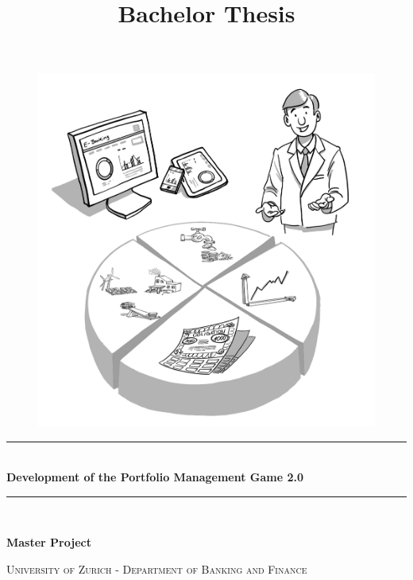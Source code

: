 \documentclass[a4paper,twoside, openright, 11pt]{scrartcl}
\title{Bachelor Thesis}
\newcommand{\HRule}{\rule{\linewidth}{0.3mm}} %
\begin{document}
\begin{titlepage}
\begingroup
\centering
\vspace*{\baselineskip}

\thispagestyle{empty}

\begin{figure}[H]
	\centering
	\begin{minipage}{.49\textwidth}
		\centering
		\includegraphics[scale=0.4]{img/InvestmentSolutions.jpg}
	\end{minipage}
\end{figure}

\vspace*{1\baselineskip}

\HRule \\[0.4cm]
{\LARGE \textbf{Development of the Portfolio Management Game 2.0}}
\HRule \\[1.5cm]

\vspace*{1\baselineskip}

{\large \textbf{Master Project}}

\vspace*{1\baselineskip}

\scshape %
\large University of Zurich - Department of Banking and Finance \\ \vspace{3.5mm}


\end{titlepage}
\end{document}
